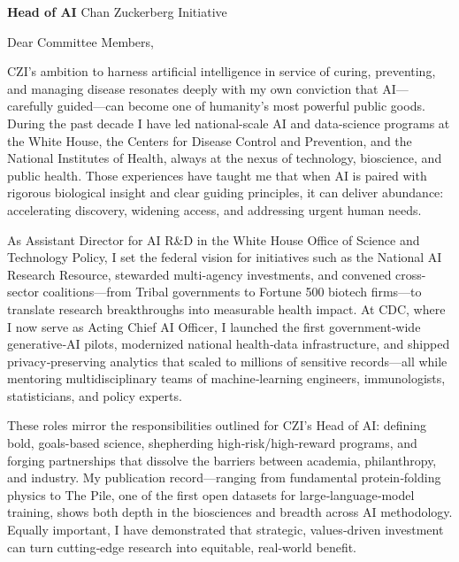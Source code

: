 \documentclass[]{scrartcl}
\begin{document}
\begin{cleanCV}

  \vspace{2em}
  \begin{raggedright}
    \textbf{Head of AI} \newline
    \hangindent=0.7cm \indent
    Chan Zuckerberg Initiative
  \end{raggedright}
  
  \vspace{2em}
  
  Dear Committee Members,

  \vspace{1em}
  \setlength{\parskip}{1em}


CZI’s ambition to harness artificial intelligence in service of curing, preventing, and managing disease resonates deeply with my own conviction that AI—carefully guided—can become one of humanity’s most powerful public goods. During the past decade I have led national-scale AI and data-science programs at the White House, the Centers for Disease Control and Prevention, and the National Institutes of Health, always at the nexus of technology, bioscience, and public health. Those experiences have taught me that when AI is paired with rigorous biological insight and clear guiding principles, it can deliver abundance: accelerating discovery, widening access, and addressing urgent human needs.

As Assistant Director for AI R\&D in the White House Office of Science and Technology Policy, I set the federal vision for initiatives such as the National AI Research Resource, stewarded multi-agency investments, and convened cross-sector coalitions—from Tribal governments to Fortune 500 biotech firms—to translate research breakthroughs into measurable health impact.
At CDC, where I now serve as Acting Chief AI Officer, I launched the first government‑wide generative‑AI pilots, modernized national health‑data infrastructure, and shipped privacy‑preserving analytics that scaled to millions of sensitive records—all while mentoring multidisciplinary teams of machine‑learning engineers, immunologists, statisticians, and policy experts.

These roles mirror the responsibilities outlined for CZI’s Head of AI: defining bold, goals-based science, shepherding high‑risk/high‑reward programs, and forging partnerships that dissolve the barriers between academia, philanthropy, and industry. My publication record—ranging from fundamental protein‑folding physics to The Pile, one of the first open datasets for large‑language‑model training, shows both depth in the biosciences and breadth across AI methodology. Equally important, I have demonstrated that strategic, values‑driven investment can turn cutting‑edge research into equitable, real‑world benefit.


\end{cleanCV}
\end{document}
